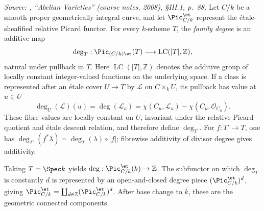 \begin{definition}\notready
  \label{def:divisor_degree_pic}

  \textit{Source: \cite{milne-av}, ``Abelian Varieties'' (course notes, 2008),
  \S III.1, p.~88.}
  Let \(C/k\) be a smooth proper geometrically integral curve, and let
  \(\Pic^{\et}_{C/k}\) represent the \'etale-sheafified relative Picard
  functor. For every \(k\)-scheme \(T\), the \emph{family degree} is an
  additive map
  \[
    \deg_T:\Pic_{(C/k)\et}(T)
      \longrightarrow \operatorname{LC}(|T|,\mathbb Z),
  \]
  natural under pullback in \(T\). Here
  \(\operatorname{LC}(|T|,\mathbb Z)\) denotes the additive group of locally
  constant integer-valued functions on the underlying space. If a class is
  represented after an \'etale cover \(U\to T\) by \(\mathcal L\) on
  \(C\times_kU\), its pullback has value at \(u\in U\)
  \[
    \deg_U(\mathcal L)(u)=\deg(\mathcal L_u)
    =\chi(C_u,\mathcal L_u)-\chi(C_u,\mathcal O_{C_u}).
  \]
  These fibre values are locally constant on \(U\), invariant under the
  relative Picard quotient and \'etale descent relation, and therefore define
  \(\deg_T\). For \(f:T'\to T\), one has
  \(\deg_{T'}(f^*\lambda)=\deg_T(\lambda)\circ|f|\); fibrewise additivity of
  divisor degree gives additivity.

  Taking \(T=\Spec k\) yields
  \(\deg:\Pic^{\et}_{C/k}(k)\to\mathbb Z\). The subfunctor on which
  \(\deg_T\) is constantly \(d\) is represented by an open-and-closed degree
  piece \((\Pic^{\et}_{C/k})^d\), giving
  \(\Pic^{\et}_{C/k}=\coprod_{d\in\mathbb Z}(\Pic^{\et}_{C/k})^d\). After
  base change to \(\overline k\), these are the geometric connected components.
\end{definition}

